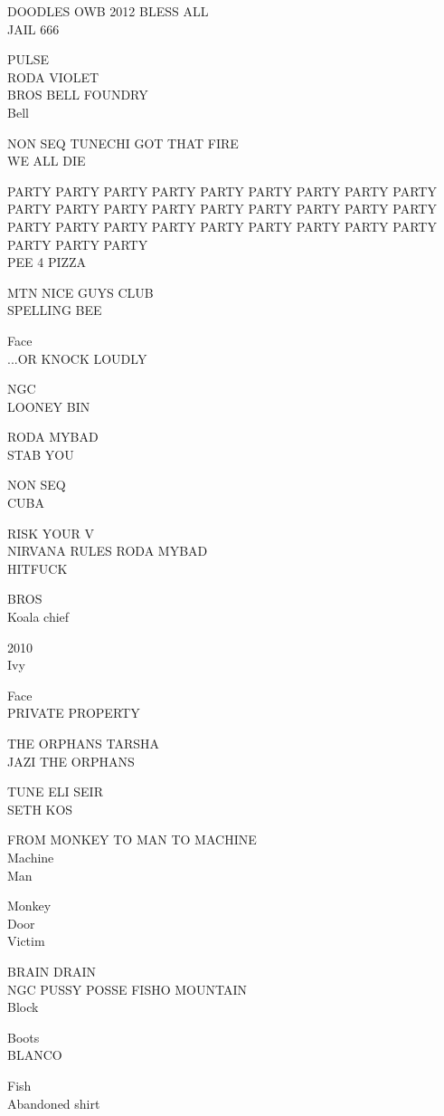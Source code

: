 \documentclass[10pt,letterpaper]{article}
\begin{document}
DOODLES OWB 2012 BLESS ALL\\
JAIL 666

PULSE\\
RODA VIOLET\\
BROS BELL FOUNDRY\\
Bell

NON SEQ TUNECHI GOT THAT FIRE\\
WE ALL DIE

PARTY PARTY PARTY PARTY PARTY PARTY PARTY PARTY PARTY PARTY PARTY PARTY PARTY PARTY PARTY PARTY PARTY PARTY PARTY PARTY PARTY PARTY PARTY PARTY PARTY PARTY PARTY PARTY PARTY PARTY\\
PEE 4 PIZZA

MTN NICE GUYS CLUB\\
SPELLING BEE

Face\\
...OR KNOCK LOUDLY

NGC\\
LOONEY BIN

RODA MYBAD\\
STAB YOU

NON SEQ\\
CUBA

RISK YOUR V\\
NIRVANA RULES RODA MYBAD\\
HITFUCK

BROS\\
Koala chief

2010\\
Ivy

Face\\
PRIVATE PROPERTY

THE ORPHANS TARSHA\\
JAZI THE ORPHANS

TUNE ELI SEIR\\
SETH KOS

FROM MONKEY TO MAN TO MACHINE\\
Machine\\
Man

Monkey\\
Door\\
Victim

BRAIN DRAIN\\
NGC PUSSY POSSE FISHO MOUNTAIN\\
Block

Boots\\
BLANCO

Fish\\
Abandoned shirt
\end{document}
